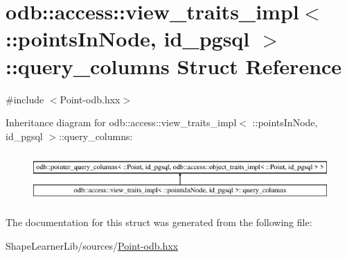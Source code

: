 \hypertarget{structodb_1_1access_1_1view__traits__impl_3_01_1_1points_in_node_00_01id__pgsql_01_4_1_1query__columns}{}\section{odb\+:\+:access\+:\+:view\+\_\+traits\+\_\+impl$<$ \+:\+:points\+In\+Node, id\+\_\+pgsql $>$\+:\+:query\+\_\+columns Struct Reference}
\label{structodb_1_1access_1_1view__traits__impl_3_01_1_1points_in_node_00_01id__pgsql_01_4_1_1query__columns}


{\ttfamily \#include $<$Point-\/odb.\+hxx$>$}

Inheritance diagram for odb\+:\+:access\+:\+:view\+\_\+traits\+\_\+impl$<$ \+:\+:points\+In\+Node, id\+\_\+pgsql $>$\+:\+:query\+\_\+columns\+:\begin{figure}[H]
\begin{center}
\leavevmode
\includegraphics[height=1.921098cm]{dc/dec/structodb_1_1access_1_1view__traits__impl_3_01_1_1points_in_node_00_01id__pgsql_01_4_1_1query__columns}
\end{center}
\end{figure}


The documentation for this struct was generated from the following file\+:\begin{DoxyCompactItemize}
\item 
Shape\+Learner\+Lib/sources/\hyperlink{_point-odb_8hxx}{Point-\/odb.\+hxx}\end{DoxyCompactItemize}
